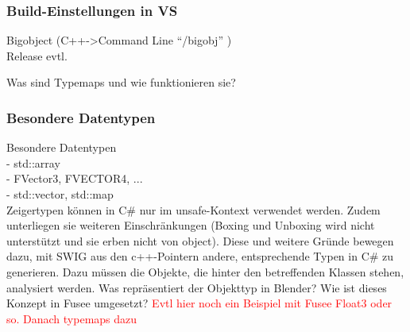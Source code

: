   

\subsubsection{Build-Einstellungen in VS}\label{subsubsec:Build}
	Bigobject (C++->Command Line "`/bigobj"' )\\
	Release evtl.


\label{subsubsec:Typemaps}

Was sind Typemaps und wie funktionieren sie?\\

\subsubsection{Besondere Datentypen}\label{subsubsec:Datentypen}
Besondere Datentypen\\
		- std::array\\
		- FVector3, FVECTOR4, ...\\
		- std::vector, std::map\\
		
Zeigertypen können in C\# nur im unsafe-Kontext verwendet werden. Zudem unterliegen sie weiteren Einschränkungen (Boxing und Unboxing wird nicht unterstützt und sie erben nicht von object). Diese und weitere Gründe bewegen dazu, mit SWIG aus den c++-Pointern andere, entsprechende Typen in C\# zu generieren. Dazu müssen die Objekte, die hinter den betreffenden Klassen stehen, analysiert werden. Was repräsentiert der Objekttyp in Blender? Wie ist dieses Konzept in Fusee umgesetzt? \textcolor{red}{Evtl hier noch ein Beispiel mit Fusee Float3 oder so. Danach typemaps dazu}
